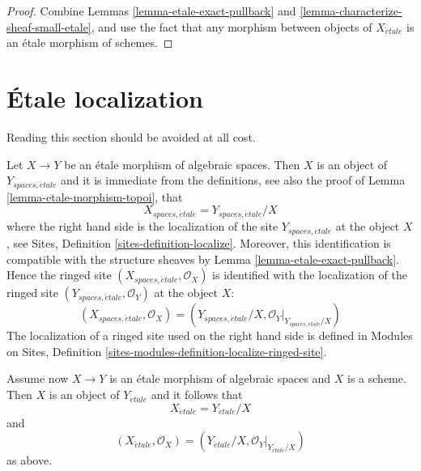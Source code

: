 \begin{proof}
Combine Lemmas \ref{lemma-etale-exact-pullback}
and \ref{lemma-characterize-sheaf-small-etale}, and use the fact that
any morphism between objects of $X_{\acute{e}tale}$ is an \'etale morphism
of schemes.
\end{proof}







\section{\'Etale localization}
\label{section-localize}

\noindent
Reading this section should be avoided at all cost.

\medskip\noindent
Let $X \to Y$ be an \'etale morphism of algebraic spaces.
Then $X$ is an object of $Y_{spaces, \acute{e}tale}$ and it is
immediate from the definitions, see also the proof of
Lemma \ref{lemma-etale-morphism-topoi},
that
\begin{equation}
\label{equation-localize}
X_{spaces, \acute{e}tale} = Y_{spaces, \acute{e}tale}/X
\end{equation}
where the right hand side is the localization of the site
$Y_{spaces, \acute{e}tale}$ at the object $X$, see
Sites, Definition \ref{sites-definition-localize}.
Moreover, this identification is compatible with the structure sheaves by
Lemma \ref{lemma-etale-exact-pullback}.
Hence the ringed site $(X_{spaces, \acute{e}tale}, \mathcal{O}_X)$
is identified with the localization of the ringed site
$(Y_{spaces, \acute{e}tale}, \mathcal{O}_Y)$ at the object $X$:
\begin{equation}
\label{equation-localize-ringed}
(X_{spaces, \acute{e}tale}, \mathcal{O}_X) =
(Y_{spaces, \acute{e}tale}/X, \mathcal{O}_Y|_{Y_{spaces, \acute{e}tale}/X})
\end{equation}
The localization of a ringed site used on the right hand side is defined in
Modules on Sites,
Definition \ref{sites-modules-definition-localize-ringed-site}.

\medskip\noindent
Assume now $X \to Y$ is an \'etale morphism of algebraic spaces and $X$ is
a scheme. Then $X$ is an object of $Y_{\acute{e}tale}$ and it follows that
\begin{equation}
\label{equation-localize-at-scheme}
X_{\acute{e}tale} = Y_{\acute{e}tale}/X
\end{equation}
and
\begin{equation}
\label{equation-localize-at-scheme-ringed}
(X_{\acute{e}tale}, \mathcal{O}_X) =
(Y_{\acute{e}tale}/X, \mathcal{O}_Y|_{Y_{\acute{e}tale}/X})
\end{equation}
as above.

